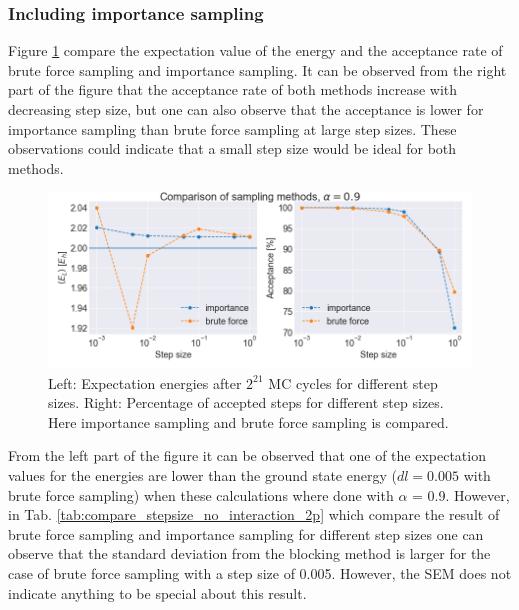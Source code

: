 \subsubsection{Including importance sampling}

Figure \ref{fig:comparing_sampling} compare the expectation value of the energy and the acceptance rate of brute force sampling and importance sampling. It can be observed from the right part of the figure that the acceptance rate of both methods increase with decreasing step size, but one can also observe that the acceptance is lower for importance sampling than brute force sampling at large step sizes. These observations could indicate that a small step size would be ideal for both methods. 

\begin{figure}[H]
\center
\includegraphics[width=0.85\linewidth]{../Results/comparing_sampling}\caption{Left: Expectation energies after $2^{21}$ MC cycles for different step sizes. Right: Percentage of accepted steps for different step sizes. Here importance sampling and brute force sampling is compared. }\label{fig:comparing_sampling}
\end{figure}


From the left part of the figure it can be observed that one of the expectation values for the energies are lower than the ground state energy ($dl = 0.005$ with brute force sampling) when these calculations where done with $\alpha$ = 0.9. However, in Tab. \ref{tab:compare_stepsize_no_interaction_2p} which compare the result of brute force sampling and importance sampling for different step sizes one can observe that the standard deviation from the blocking method is larger for the case of brute force sampling with a step size of 0.005. However,  the SEM does not indicate anything to be special about this result.

